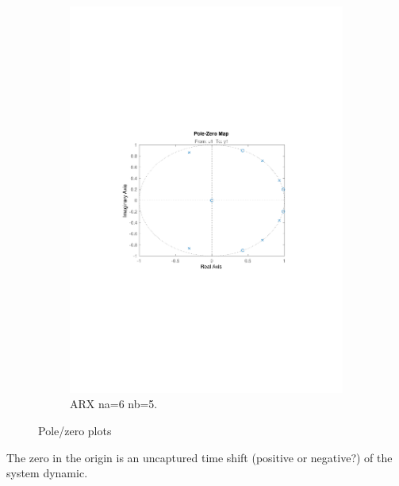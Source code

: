 \documentclass[]{article}
\begin{document}
\begin{figure}[ht]
\begin{subfigure}{.49\textwidth}
	\includegraphics[trim= 10cm 8cm 10cm 8cm, scale=0.4]{figures/pz_arx_65.pdf}
	\caption{ARX na=6 nb=5.}
	\label{fig:pzplot_arx2}
\end{subfigure}
\caption{Pole/zero plots}
\label{fig:pzplot}
\end{figure}

The zero in the origin is an uncaptured time shift (positive or negative?) of the system dynamic.
\end{document}
